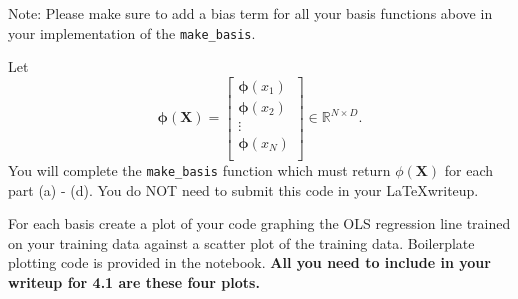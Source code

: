 \documentclass[submit]{harvardml}
\begin{document}
\begin{problem}
\begin{enumerate}
{\footnotesize * Note: Please make sure to add a bias term for
all your basis functions above in your implementation of the 
\verb|make_basis|.}

Let 
$$ \mathbf{\phi}(\mathbf{X}) = 
\begin{bmatrix} 
\mathbf{\phi}(x_1) \\
\mathbf{\phi}(x_2) \\
\vdots \\
\mathbf{\phi}(x_N) \\
\end{bmatrix} \in \mathbb{R}^{N\times D}.$$
You will complete the \verb|make_basis| function which must return
$\phi(\mathbf{X})$ for each part 
(a) - (d). You do NOT need to submit this
code in your \LaTeX writeup.


For each basis create a plot of your code graphing the OLS 
regression line trained on your training data against a 
scatter plot of the training data. Boilerplate plotting code
is provided in the notebook. \textbf{All you need to include 
in your writeup for 4.1 are these four plots.}
\vspace{1em}
\end{enumerate}
\end{problem}
\end{document}
